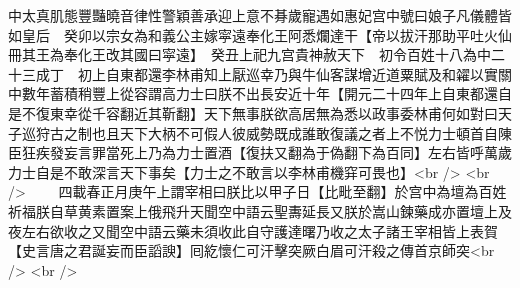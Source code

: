 中太真肌態豐豔曉音律性警穎善承迎上意不朞歲寵遇如惠妃宫中號曰娘子凡儀體皆如皇后　癸卯以宗女為和義公主嫁寜遠奉化王阿悉爛達干【帝以拔汗那助平吐火仙冊其王為奉化王改其國曰寜遠】　癸丑上祀九宫貴神赦天下　初令百姓十八為中二十三成丁　初上自東都還李林甫知上厭巡幸乃與牛仙客謀增近道粟賦及和糴以實關中數年蓄積稍豐上從容謂高力士曰朕不出長安近十年【開元二十四年上自東都還自是不復東幸從千容翻近其靳翻】天下無事朕欲高居無為悉以政事委林甫何如對曰天子巡狩古之制也且天下大柄不可假人彼威勢既成誰敢復議之者上不悦力士頓首自陳臣狂疾發妄言罪當死上乃為力士置酒【復扶又翻為于偽翻下為百同】左右皆呼萬歲力士自是不敢深言天下事矣【力士之不敢言以李林甫機穽可畏也】<br />
<br />
　　四載春正月庚午上謂宰相曰朕比以甲子日【比毗至翻】於宫中為壇為百姓祈福朕自草黄素置案上俄飛升天聞空中語云聖夀延長又朕於嵩山鍊藥成亦置壇上及夜左右欲收之又聞空中語云藥未須收此自守護達曙乃收之太子諸王宰相皆上表賀【史言唐之君誕妄而臣謟諛】囘紇懷仁可汗擊突厥白眉可汗殺之傳首京師突<br />
<br />
